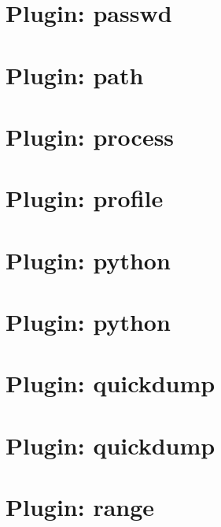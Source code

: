 \let\mypdfximage\pdfximage\def\pdfximage{\immediate\mypdfximage}\documentclass[twoside]{book}
\newcommand{\+}{\discretionary{\mbox{\scriptsize$\hookleftarrow$}}{}{}}
\begin{document}
\chapter{Plugin\+: passwd}
\label{md_src_plugins_passwd_README}

\chapter{Plugin\+: path}
\label{md_src_plugins_path_README}

\chapter{Plugin\+: process}
\label{md_src_plugins_process_README}

\chapter{Plugin\+: profile}
\label{md_src_plugins_profile_README}

\chapter{Plugin\+: python}
\label{md_src_plugins_python_python_dns_README}

\chapter{Plugin\+: python}
\label{md_src_plugins_python_README}

\chapter{Plugin\+: quickdump}
\label{md_src_plugins_quickdump_benchmarks}

\chapter{Plugin\+: quickdump}
\label{md_src_plugins_quickdump_README}

\chapter{Plugin\+: range}
\label{md_src_plugins_range_README}

\end{document}
